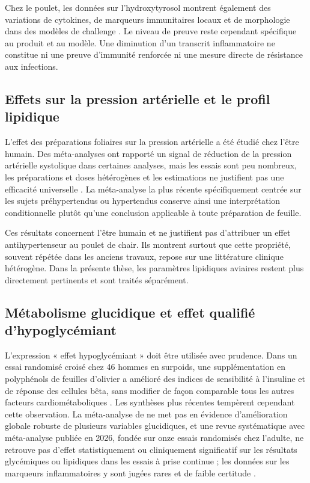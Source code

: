Chez le poulet, les données sur l'hydroxytyrosol montrent également des variations de cytokines, de marqueurs immunitaires locaux et de morphologie dans des modèles de challenge \citep{Shan2022,Dias2024}. Le niveau de preuve reste cependant spécifique au produit et au modèle. Une diminution d'un transcrit inflammatoire ne constitue ni une preuve d'immunité renforcée ni une mesure directe de résistance aux infections.

\subsection{Effets sur la pression artérielle et le profil lipidique}

L'effet des préparations foliaires sur la pression artérielle a été étudié chez l'être humain. Des méta-analyses ont rapporté un signal de réduction de la pression artérielle systolique dans certaines analyses, mais les essais sont peu nombreux, les préparations et doses hétérogènes et les estimations ne justifient pas une efficacité universelle \citep{Ismail2021,Razmpoosh2022,Lachovicz2025}. La méta-analyse la plus récente spécifiquement centrée sur les sujets préhypertendus ou hypertendus conserve ainsi une interprétation conditionnelle plutôt qu'une conclusion applicable à toute préparation de feuille.

Ces résultats concernent l'être humain et ne justifient pas d'attribuer un effet antihypertenseur au poulet de chair. Ils montrent surtout que cette propriété, souvent répétée dans les anciens travaux, repose sur une littérature clinique hétérogène. Dans la présente thèse, les paramètres lipidiques aviaires restent plus directement pertinents et sont traités séparément.

\subsection{Métabolisme glucidique et effet qualifié d'hypoglycémiant}

L'expression « effet hypoglycémiant » doit être utilisée avec prudence. Dans un essai randomisé croisé chez 46 hommes en surpoids, une supplémentation en polyphénols de feuilles d'olivier a amélioré des indices de sensibilité à l'insuline et de réponse des cellules bêta, sans modifier de façon comparable tous les autres facteurs cardiométaboliques \citep{DeBock2013}. Les synthèses plus récentes tempèrent cependant cette observation. La méta-analyse de \citet{Razmpoosh2022} ne met pas en évidence d'amélioration globale robuste de plusieurs variables glucidiques, et une revue systématique avec méta-analyse publiée en 2026, fondée sur onze essais randomisés chez l'adulte, ne retrouve pas d'effet statistiquement ou cliniquement significatif sur les résultats glycémiques ou lipidiques dans les essais à prise continue ; les données sur les marqueurs inflammatoires y sont jugées rares et de faible certitude \citep{Menezes2026Meta}.

